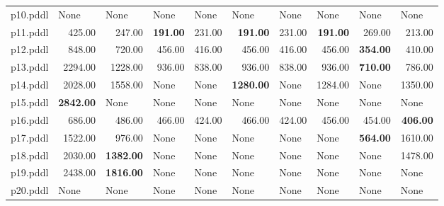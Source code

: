 \documentclass{article}
\begin{document}
\begin{tabular}{@{}lrrrrrrrrr@{}}
p10.pddl & \multicolumn{1}{|l|}{None} & \multicolumn{1}{|l|}{None} & \multicolumn{1}{|l|}{None} & \multicolumn{1}{|l|}{None} & \multicolumn{1}{|l|}{None} & \multicolumn{1}{|l|}{None} & \multicolumn{1}{|l|}{None} & \multicolumn{1}{|l|}{None} & \multicolumn{1}{|l|}{None} \\
p11.pddl & 425.00 & 247.00 & \textbf{191.00} & 231.00 & \textbf{191.00} & 231.00 & \textbf{191.00} & 269.00 & 213.00 \\
p12.pddl & 848.00 & 720.00 & 456.00 & 416.00 & 456.00 & 416.00 & 456.00 & \textbf{354.00} & 410.00 \\
p13.pddl & 2294.00 & 1228.00 & 936.00 & 838.00 & 936.00 & 838.00 & 936.00 & \textbf{710.00} & 786.00 \\
p14.pddl & 2028.00 & 1558.00 & \multicolumn{1}{|l|}{None} & \multicolumn{1}{|l|}{None} & \textbf{1280.00} & \multicolumn{1}{|l|}{None} & 1284.00 & \multicolumn{1}{|l|}{None} & 1350.00 \\
p15.pddl & \textbf{2842.00} & \multicolumn{1}{|l|}{None} & \multicolumn{1}{|l|}{None} & \multicolumn{1}{|l|}{None} & \multicolumn{1}{|l|}{None} & \multicolumn{1}{|l|}{None} & \multicolumn{1}{|l|}{None} & \multicolumn{1}{|l|}{None} & \multicolumn{1}{|l|}{None} \\
p16.pddl & 686.00 & 486.00 & 466.00 & 424.00 & 466.00 & 424.00 & 456.00 & 454.00 & \textbf{406.00} \\
p17.pddl & 1522.00 & 976.00 & \multicolumn{1}{|l|}{None} & \multicolumn{1}{|l|}{None} & \multicolumn{1}{|l|}{None} & \multicolumn{1}{|l|}{None} & \multicolumn{1}{|l|}{None} & \textbf{564.00} & 1610.00 \\
p18.pddl & 2030.00 & \textbf{1382.00} & \multicolumn{1}{|l|}{None} & \multicolumn{1}{|l|}{None} & \multicolumn{1}{|l|}{None} & \multicolumn{1}{|l|}{None} & \multicolumn{1}{|l|}{None} & \multicolumn{1}{|l|}{None} & 1478.00 \\
p19.pddl & 2438.00 & \textbf{1816.00} & \multicolumn{1}{|l|}{None} & \multicolumn{1}{|l|}{None} & \multicolumn{1}{|l|}{None} & \multicolumn{1}{|l|}{None} & \multicolumn{1}{|l|}{None} & \multicolumn{1}{|l|}{None} & \multicolumn{1}{|l|}{None} \\
p20.pddl & \multicolumn{1}{|l|}{None} & \multicolumn{1}{|l|}{None} & \multicolumn{1}{|l|}{None} & \multicolumn{1}{|l|}{None} & \multicolumn{1}{|l|}{None} & \multicolumn{1}{|l|}{None} & \multicolumn{1}{|l|}{None} & \multicolumn{1}{|l|}{None} & \multicolumn{1}{|l|}{None} \\
\end{tabular}
\end{document}
